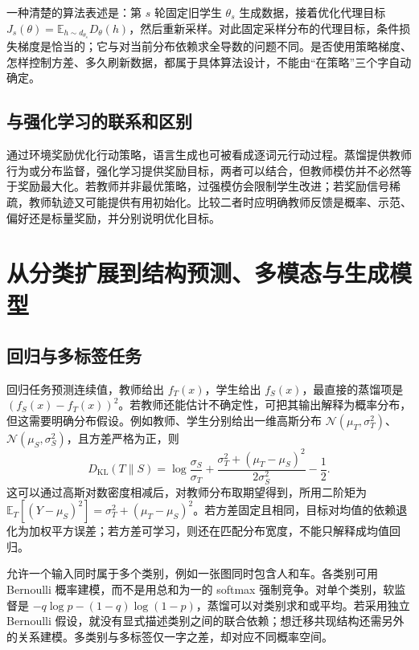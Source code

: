 \documentclass[UTF8,12pt,a4paper,fontset=fandol]{ctexart}
\begin{document}
一种清楚的算法表述是：第 $s$ 轮固定旧学生 $\theta_s$ 生成数据，接着优化代理目标 $J_s(\theta)=\mathbb E_{h\sim d_{\theta_s}}D_\theta(h)$，然后重新采样。对此固定采样分布的代理目标，条件损失梯度是恰当的；它与对当前分布依赖求全导数的问题不同。是否使用策略梯度、怎样控制方差、多久刷新数据，都属于具体算法设计，不能由“在策略”三个字自动确定。

\subsection{与强化学习的联系和区别}
通过环境奖励优化行动策略，语言生成也可被看成逐词元行动过程。蒸馏提供教师行为或分布监督，强化学习提供奖励目标，两者可以结合，但教师模仿并不必然等于奖励最大化。若教师并非最优策略，过强模仿会限制学生改进；若奖励信号稀疏，教师轨迹又可能提供有用初始化。比较二者时应明确教师反馈是概率、示范、偏好还是标量奖励，并分别说明优化目标。

\section{从分类扩展到结构预测、多模态与生成模型}
\label{sec:kd-applications}

\subsection{回归与多标签任务}
回归任务预测连续值，教师给出 $f_T(x)$，学生给出 $f_S(x)$，最直接的蒸馏项是 $(f_S(x)-f_T(x))^2$。若教师还能估计不确定性，可把其输出解释为概率分布，但这需要明确分布假设。例如教师、学生分别给出一维高斯分布 $\mathcal N(\mu_T,\sigma_T^2)$、$\mathcal N(\mu_S,\sigma_S^2)$，且方差严格为正，则
\begin{equation}
 D_{\mathrm{KL}}(T\|S)=\log\frac{\sigma_S}{\sigma_T}
 +\frac{\sigma_T^2+(\mu_T-\mu_S)^2}{2\sigma_S^2}-\frac12.
 \label{eq:kd-gaussian}
\end{equation}
这可以通过高斯对数密度相减后，对教师分布取期望得到，所用二阶矩为 $\mathbb E_T[(Y-\mu_S)^2]=\sigma_T^2+(\mu_T-\mu_S)^2$。若方差固定且相同，目标对均值的依赖退化为加权平方误差；若方差可学习，则还在匹配分布宽度，不能只解释成均值回归。

允许一个输入同时属于多个类别，例如一张图同时包含人和车。各类别可用 Bernoulli 概率建模，而不是用总和为一的 softmax 强制竞争。对单个类别，软监督是 $-q\log p-(1-q)\log(1-p)$，蒸馏可以对类别求和或平均。若采用独立 Bernoulli 假设，就没有显式描述类别之间的联合依赖；想迁移共现结构还需另外的关系建模。多类别与多标签仅一字之差，却对应不同概率空间。
\end{document}

